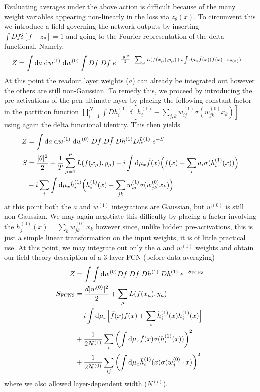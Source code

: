  
Evaluating averages under the above action is difficult because of the many weight variables appearing non-linearly in the loss via $z_{ {\theta}}(x)$. To circumvent this we introduce a field governing the network outputs by inserting $\int Df \delta[f-z_{{\theta}}]=1$ and going to the Fourier representation of the delta functional. Namely, 
\begin{align}
Z &= \int \text{d} {a} \; \text{d} {w^{(1)}} \; \text{d}{w^{(0)}} \int Df \; D\tilde{f} \; e^{-\frac{|{\theta}|^2}{2}- \sum_{\mu} L(f(x_{\mu}),y_{\mu})+i \int d\mu_x \tilde{f}(x) (f(x)-z_{{\theta}(x)})}
\end{align}
At this point the readout layer weights (${a}$) can already be integrated out however the others are still non-Gaussian. To remedy this, we proceed by introducing the pre-activations of the pen-ultimate layer by placing the following constant factor in the partition function  $\prod_{i=1}^N \int D h_i^{(1)}\delta[h_i^{(1)}-\sum_{j,k}w^{(1)}_{ij} \sigma(w^{(0)}_{jk}x_k)]$ using again the delta functional identity. This then yields 
\begin{align}
Z&=\int \text{d}{a} \; \text{d} {w^{(1)}} \; \text{d}{w^{(0)}} \; Df \; D\tilde{f} \; D{h}^{(1)}D{\tilde{h}}^{(1)} \; e^{-S} \\ \nonumber 
S &= \frac{|{\theta}|^2}{2}+\frac{1}{T}\sum_{\mu=1}^P L(f(x_{\mu}),y_{\mu})-i \int \text{d}\mu_x \tilde{f}(x) \Big(f(x)-\sum_i a_i \sigma(h^{(1)}_i(x))\Big) \\ \nonumber 
&- i\sum_i \int \text{d} \mu_x \tilde{h}^{(1)}_i \Big(h^{(1)}_i(x) - \sum_{jk} w^{(1)}_{ij} \sigma(w^{(0)}_{jk }x_k)\Big)
\end{align}
at this point both the ${a}$ and ${w}^{(1)}$ integrations are Gaussian, but ${w}^{(0)}$ is still non-Gaussian. We may again negotiate this difficulty by placing a factor involving the $h^{(0)}_j(x)=\sum_{k}w^{(0)}_{jk}x_k$ however since, unlike hidden pre-activations, this is just a simple linear transformation on the input weights, it is of little practical use. At this point, we may integrate out only the ${a}$ and ${w}^{(1)}$ weights and obtain our field theory description of a 3-layer FCN (before data averaging) 
\begin{align}
\label{Eq:FCN3}
Z &= \int \int \text{d} {{w}^{(0)}}Df \; D\tilde{f} \; D{h}^{(1)} \; D{\tilde{h}}^{(1)} \; e^{-S_{\text{FCN3}}} \\ \nonumber 
S_{\text{FCN3}} &= \frac{d |{ w^{(0)}}|^2}{2}+\sum_{\mu} L(f(x_{\mu}),y_{\mu}) \\ \nonumber
&- i\int \text{d}\mu_x \Big[\tilde{f}(x) f(x)+\sum_i
\tilde{h}^{(1)}_i(x) h^{(1)}_i(x)\Big] \\ \nonumber 
&+\frac{1}{2N^{(1)}} \sum_i \left(\int \text{d}\mu_x \tilde{f}(x) \sigma(h^{(1)}_i(x))\right)^2\\ \nonumber
&+ \frac{1}{2N^{(0)}}\sum_{ij}\left( \int \text{d} \mu_x \tilde{h}^{(1)}_i(x) \sigma({w}^{(0)}_{j} \cdot {x})\right)^2
\end{align}
where we also allowed layer-dependent width ($N^{(l)}$). 

